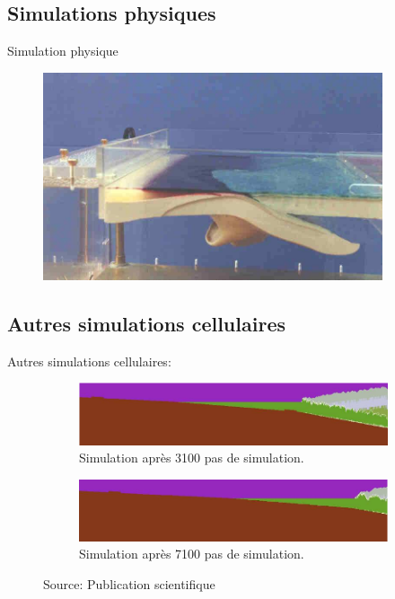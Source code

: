 \documentclass{beamer}
\begin{document}
\subsection{Simulations physiques}
\begin{frame}
 \begin{center}
	\LARGE Simulation physique
  \begin{figure}
   \includegraphics[width=10cm]{Images/simulation_physique.png}
  \end{figure}
 \end{center}
\end{frame}

\subsection{Autres simulations cellulaires}
\begin{frame}
 \begin{center}
	\Large Autres simulations cellulaires:
	\begin{figure}
  \begin{figure}
   \includegraphics[width=10cm]{Images/3100_cell.png}
   \caption{Simulation après 3100 pas de simulation.}
  \end{figure}
  \begin{figure}
   \includegraphics[width=10cm]{Images/7100_cell.png}
   \caption{Simulation après 7100 pas de simulation.}
  \end{figure}
  \caption{Source: Publication scientifique}
  \end{figure}
  
 \end{center}
\end{frame}
\end{document}
